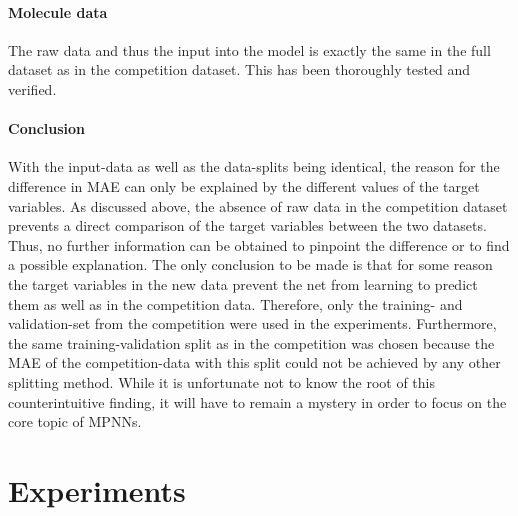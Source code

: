 
\paragraph{Molecule data}

The raw data and thus the input into the model is exactly the same in the full dataset as in the competition dataset. This has been thoroughly tested and verified.

\paragraph{Conclusion}

With the input-data as well as the data-splits being identical, the reason for the difference in MAE can only be explained by the different values of the target variables. As discussed above, the absence of raw data in the competition dataset prevents a direct comparison of the target variables between the two datasets. Thus, no further information can be obtained to pinpoint the difference or to find a possible explanation. The only conclusion to be made is that for some reason the target variables in the new data prevent the net from learning to predict them as well as in the competition data. Therefore, only the training- and validation-set from the competition were used in the experiments. Furthermore, the same training-validation split as in the competition was chosen because the MAE of the competition-data with this split could not be achieved by any other splitting method. While it is unfortunate not to know the root of this counterintuitive finding, it will have to remain a mystery in order to focus on the core topic of MPNNs. 

 
\section{Experiments}

